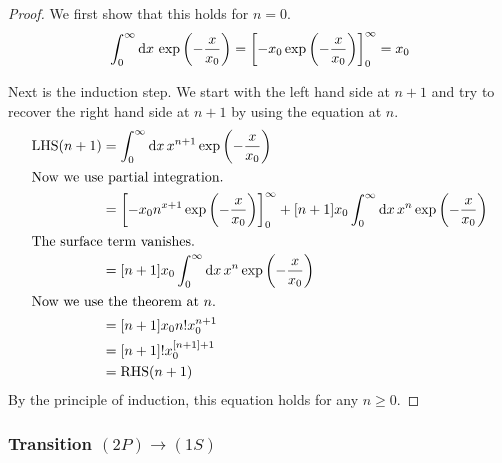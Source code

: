 \documentclass[11pt, english, fleqn, DIV=15, headinclude, BCOR=1.5cm]{scrartcl}
\begin{document}
\begin{proof}
    We first show that this holds for $n = 0$.
    \[
        \int_0^\infty \mathop{}\!\mathrm d x \, \exp\left( - \frac{x}{x_0} \right)
        = \left[ -x_0 \exp\left( - \frac{x}{x_0} \right) \right]_0^\infty
        = x_0
    \]

    Next is the induction step. We start with the left hand side at $n + 1$ and
    try to recover the right hand side at $n+1$ by using the equation at $n$.
    \begin{align*}
        \operatorname{LHS}(n+1)
        &= \int_0^\infty \dif x \, x^{n+1} \exp\del{- \frac{x}{x_0}} \\
        \intertext{%
            Now we use partial integration.
        }
        &= \sbr{- x_0 n^{x+1} \exp\del{- \frac{x}{x_0}}}_0^\infty + [n+1] x_0
        \int_0^\infty \dif x \, x^{n} \exp\del{- \frac{x}{x_0}} \\
        \intertext{%
            The surface term vanishes.
        }
        &= [n+1] x_0 \int_0^\infty \dif x \, x^{n} \exp\del{- \frac{x}{x_0}} \\
        \intertext{%
            Now we use the theorem at $n$.
        }
        &= [n+1] x_0 n! x_0^{n+1} \\
        &= [n+1]! x_0^{[n+1]+1} \\
        &= \operatorname{RHS}(n+1)
    \end{align*}
    By the principle of induction, this equation holds for any $n \geq 0$.
\end{proof}

\subsubsection{Transition $(2P) \to (1S)$}
\end{document}
